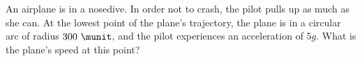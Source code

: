 An airplane is in a nosedive. In order not to crash, the pilot pulls
up as much as she can. At the lowest point of the plane's trajectory,
the plane is in a circular arc of radius $300\ \munit$, and the pilot
experiences an acceleration of $5g$. What is the plane's speed at
this point?
